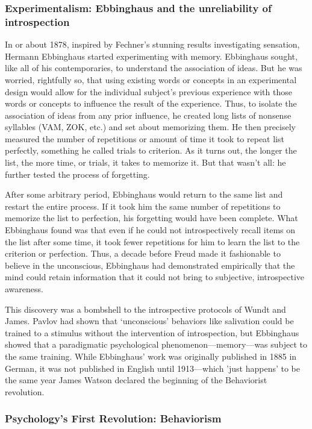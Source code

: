 \subsubsection{Experimentalism: Ebbinghaus and the unreliability of introspection}
\label{experimentalism:ebbinghausandtheunreliabilityofintrospection}

In or about 1878, inspired by Fechner's stunning results investigating sensation, Hermann Ebbinghaus started experimenting with memory. Ebbinghaus sought, like all of his contemporaries, to understand the association of ideas. But he was worried, rightfully so, that using existing words or concepts in an experimental design would allow for the individual subject's previous experience with those words or concepts to influence the result of the experience. Thus, to isolate the association of ideas from any prior influence, he created long lists of nonsense syllables (VAM, ZOK, etc.) and set about memorizing them. He then precisely measured the number of repetitions or amount of time it took to repeat list perfectly, something he called trials to criterion. As it turns out, the longer the list, the more time, or trials, it takes to memorize it. But that wasn't all: he further tested the process of forgetting.

After some arbitrary period, Ebbinghaus would return to the same list and restart the entire process. If it took him the same number of repetitions to memorize the list to perfection, his forgetting would have been complete. What Ebbinghaus found was that even if he could not introspectively recall items on the list after some time, it took fewer repetitions for him to learn the list to the criterion or perfection. Thus, a decade before Freud made it fashionable to believe in the unconscious, Ebbinghaus had demonstrated empirically that the mind could retain information that it could not bring to subjective, introspective awareness.

This discovery was a bombshell to the introspective protocols of Wundt and James. Pavlov had shown that `unconscious' behaviors like salivation could be trained to a stimulus without the intervention of introspection, but Ebbinghaus showed that a paradigmatic psychological phenomenon—memory—was subject to the same training. While Ebbinghaus' work was originally published in 1885 in German, it was not published in English until 1913---which ’just happens’ to be the same year James Watson declared the beginning of the Behaviorist revolution.

\subsubsection{Psychology’s First Revolution: Behaviorism}
\label{psychology’sfirstrevolution:behaviorism}


